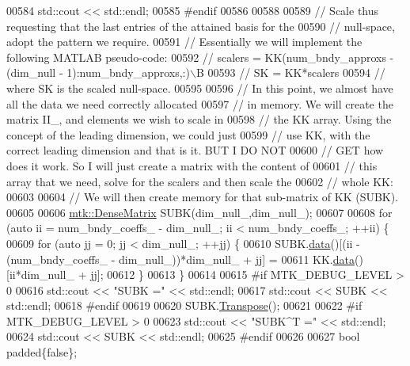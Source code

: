 \begin{DoxyCode}
{{00584   std::cout << std::endl;
00585 \textcolor{preprocessor}{  #endif}
00586 
00588 
00589   \textcolor{comment}{// Scale thus requesting that the last entries of the attained basis for the}
00590   \textcolor{comment}{// null-space, adopt the pattern we require.}
00591   \textcolor{comment}{// Essentially we will implement the following MATLAB pseudo-code:}
00592   \textcolor{comment}{//  scalers = KK(num\_bndy\_approxs - (dim\_null - 1):num\_bndy\_approxs,:)\(\backslash\)B}
00593   \textcolor{comment}{//  SK = KK*scalers}
00594   \textcolor{comment}{// where SK is the scaled null-space.}
00595 
00596   \textcolor{comment}{// In this point, we almost have all the data we need correctly allocated}
00597   \textcolor{comment}{// in memory. We will create the matrix II\_, and elements we wish to scale in}
00598   \textcolor{comment}{// the KK array. Using the concept of the leading dimension, we could just}
00599   \textcolor{comment}{// use KK, with the correct leading dimension and that is it. BUT I DO NOT}
00600   \textcolor{comment}{// GET how does it work. So I will just create a matrix with the content of}
00601   \textcolor{comment}{// this array that we need, solve for the scalers and then scale the}
00602   \textcolor{comment}{// whole KK:}
00603 
00604   \textcolor{comment}{// We will then create memory for that sub-matrix of KK (SUBK).}
00605 
00606   \hyperlink{classmtk_1_1DenseMatrix}{mtk::DenseMatrix} SUBK(dim\_null\_,dim\_null\_);
00607 
00608   \textcolor{keywordflow}{for} (\textcolor{keyword}{auto} ii = num\_bndy\_coeffs\_ - dim\_null\_; ii < num\_bndy\_coeffs\_; ++ii) \{
00609     \textcolor{keywordflow}{for} (\textcolor{keyword}{auto} jj = 0; jj < dim\_null\_; ++jj) \{
00610       SUBK.\hyperlink{classmtk_1_1DenseMatrix_a0c33b8a9e01d157c61ddbdf807c25d84}{data}()[(ii - (num\_bndy\_coeffs\_ - dim\_null\_))*dim\_null\_ + jj] =
00611           KK.\hyperlink{classmtk_1_1DenseMatrix_a0c33b8a9e01d157c61ddbdf807c25d84}{data}()[ii*dim\_null\_ + jj];
00612     \}
00613   \}
00614 
00615 \textcolor{preprocessor}{  #if MTK\_DEBUG\_LEVEL > 0}
00616   std::cout << \textcolor{stringliteral}{"SUBK ="} << std::endl;
00617   std::cout << SUBK << std::endl;
00618 \textcolor{preprocessor}{  #endif}
00619 
00620   SUBK.\hyperlink{classmtk_1_1DenseMatrix_a71d9c07ca66e88d97d1fd5012f43138b}{Transpose}();
00621 
00622 \textcolor{preprocessor}{  #if MTK\_DEBUG\_LEVEL > 0}
00623   std::cout << \textcolor{stringliteral}{"SUBK^T ="} << std::endl;
00624   std::cout << SUBK << std::endl;
00625 \textcolor{preprocessor}{  #endif}
00626 
00627   \textcolor{keywordtype}{bool} padded\{\textcolor{keyword}{false}\};
}}
\end{DoxyCode}
